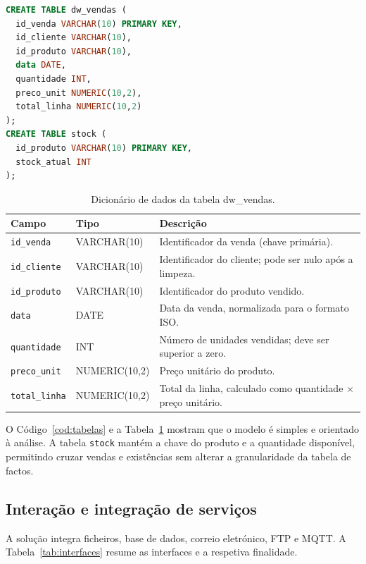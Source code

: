 \documentclass[11pt,a4paper]{article}
\begin{document}
\begin{lstlisting}[language=SQL, caption={Criação das tabelas dw\_vendas e stock na base de dados isi\_store.}, label={cod:tabelas}]
CREATE TABLE dw_vendas (
  id_venda VARCHAR(10) PRIMARY KEY,
  id_cliente VARCHAR(10),
  id_produto VARCHAR(10),
  data DATE,
  quantidade INT,
  preco_unit NUMERIC(10,2),
  total_linha NUMERIC(10,2)
);
CREATE TABLE stock (
  id_produto VARCHAR(10) PRIMARY KEY,
  stock_atual INT
);
\end{lstlisting}

\begin{table}[H]
\centering
\small
\begin{tabular}{|l|l|p{7cm}|}
\hline
Campo & Tipo & Descrição \\ \hline
\texttt{id\_venda} & VARCHAR(10) & Identificador da venda (chave primária). \\ \hline
\texttt{id\_cliente} & VARCHAR(10) & Identificador do cliente; pode ser nulo após a limpeza. \\ \hline
\texttt{id\_produto} & VARCHAR(10) & Identificador do produto vendido. \\ \hline
\texttt{data} & DATE & Data da venda, normalizada para o formato ISO. \\ \hline
\texttt{quantidade} & INT & Número de unidades vendidas; deve ser superior a zero. \\ \hline
\texttt{preco\_unit} & NUMERIC(10,2) & Preço unitário do produto. \\ \hline
\texttt{total\_linha} & NUMERIC(10,2) & Total da linha, calculado como quantidade $\times$ preço unitário. \\ \hline
\end{tabular}
\caption{Dicionário de dados da tabela dw\_vendas.}
\label{tab:dicionario}
\end{table}

O Código~\ref{cod:tabelas} e a Tabela~\ref{tab:dicionario} mostram que o modelo é simples e orientado à análise. A tabela \texttt{stock} mantém a chave do produto e a quantidade disponível, permitindo cruzar vendas e existências sem alterar a granularidade da tabela de factos.

\subsection{Interação e integração de serviços}
A solução integra ficheiros, base de dados, correio eletrónico, FTP e MQTT. A Tabela~\ref{tab:interfaces} resume as interfaces e a respetiva finalidade.
\end{document}
